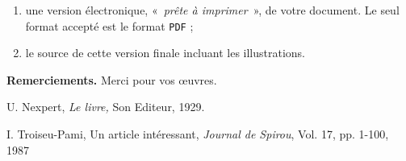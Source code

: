 \documentclass[demonstration]{jfsma}
\begin{document}
\begin{enumerate}
\item une version électronique, «~\emph{prête à imprimer}~», de votre document.
  Le seul format accepté est le format \texttt{PDF} ;
\item le source de cette version finale incluant les illustrations.
\end{enumerate}


\textbf{Remerciements.} Merci pour vos œuvres.

\begin{thebibliography}{9}
{\small
{} U. Nexpert, \emph{Le livre,} Son Editeur, 1929.

 I. Troiseu-Pami, Un article intéressant, \emph{Journal de
    Spirou}, Vol. 17, pp. 1-100, 1987
}
\end{thebibliography}
\end{document}

